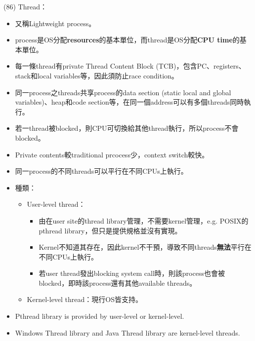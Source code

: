 \begin{theorem}{(86)} Thread：\begin{itemize}
        \item 又稱Lightweight process。
        \item process是OS分配\textbf{resources}的基本單位，而thread是OS分配\textbf{CPU time}的基本單位。
        \item 每一條thread有private Thread Content Block (TCB)，包含PC、registers、stack和local variables等，因此須防止race condition。
        \item 同一process之threads共享process的data section (static local and global variables)、heap和code section等，在同一個address可以有多個threads同時執行。
        \item 若一thread被blocked，則CPU可切換給其他thread執行，所以process不會blocked。
        \item Private contents較traditional prcocess少，context switch較快。
        \item 同一process的不同threads可以平行在不同CPUs上執行。
        \item 種類：\begin{itemize}
            \item User-level thread：\begin{itemize}
                \item 由在user site的thread library管理，不需要kernel管理，e.g. POSIX的pthread library，但只是提供規格並沒有實現。
                \item Kernel不知道其存在，因此kernel不干預，導致不同threads\textbf{無法}平行在不同CPUs上執行。
                \item 若user thread發出blocking system call時，則該process也會被blocked，即時該process還有其他available threads。
            \end{itemize}
            \item Kernel-level thread：現行OS皆支持。
        \end{itemize}
        \item Pthread library is provided by user-level or kernel-level.
        \item Windows Thread library and Java Thread library are kernel-level threads.
    \end{itemize}
\end{theorem}


